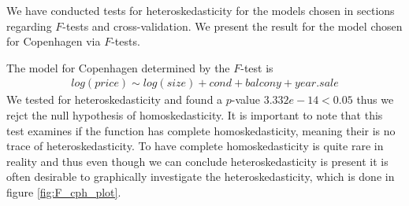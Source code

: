 We have conducted tests for heteroskedasticity for the models chosen in sections regarding $F$-tests and cross-validation.
We present the result for the model chosen for Copenhagen via $F$-tests. 

The model for Copenhagen determined by the $F$-test is
\begin{align}
    log(price) \sim log(size) + cond + balcony + year.sale
\end{align}
We tested for heteroskedasticity and found a $p$-value $ 3.332e-14 < 0.05$ thus we rejct the null hypothesis of homoskedasticity. 
It is important to note that this test examines if the function has complete homoskedasticity, meaning their is no trace of heteroskedasticity. To have complete homoskedasticity is quite rare in reality and thus even though we can conclude heteroskedasticity is present it is often desirable to graphically investigate the heteroskedasticity, which is done in figure \ref{fig:F_cph_plot}. 


